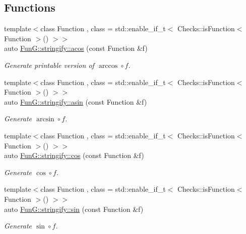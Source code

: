 \subsection*{Functions}
\begin{DoxyCompactItemize}
\item 
{\footnotesize template$<$class Function , class  = std\-::enable\-\_\-if\-\_\-t$<$ Checks\-::is\-Function$<$ Function $>$() $>$$>$ }\\auto \hyperlink{group__StringifyCMathGroup_gaec458ee50fd7b49de4dc2ed1286e8286}{Fun\-G\-::stringify\-::acos} (const Function \&f)
\begin{DoxyCompactList}\small\item\em Generate printable version of $ \arccos\circ f $. \end{DoxyCompactList}\item 
{\footnotesize template$<$class Function , class  = std\-::enable\-\_\-if\-\_\-t$<$ Checks\-::is\-Function$<$ Function $>$() $>$$>$ }\\auto \hyperlink{group__StringifyCMathGroup_gab50530d1358bb1d94ecaea4026fd83ea}{Fun\-G\-::stringify\-::asin} (const Function \&f)
\begin{DoxyCompactList}\small\item\em Generate $ \arcsin\circ f $. \end{DoxyCompactList}\item 
{\footnotesize template$<$class Function , class  = std\-::enable\-\_\-if\-\_\-t$<$ Checks\-::is\-Function$<$ Function $>$() $>$$>$ }\\auto \hyperlink{group__StringifyCMathGroup_gaaa7d5292922e58b22115bc27d784dcfd}{Fun\-G\-::stringify\-::cos} (const Function \&f)
\begin{DoxyCompactList}\small\item\em Generate $ \cos\circ f $. \end{DoxyCompactList}\item 
{\footnotesize template$<$class Function , class  = std\-::enable\-\_\-if\-\_\-t$<$ Checks\-::is\-Function$<$ Function $>$() $>$$>$ }\\auto \hyperlink{group__StringifyCMathGroup_gaa44ea064dbf1d4befb6766de66a994e5}{Fun\-G\-::stringify\-::sin} (const Function \&f)
\begin{DoxyCompactList}\small\item\em Generate $ \sin\circ f $. \end{DoxyCompactList}\end{DoxyCompactItemize}


